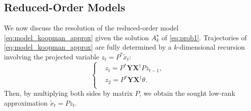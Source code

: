 \documentclass{article}
\newcommand{\Rr}{\mathds{R}}
\newcommand{\R}{P}
\newcommand{\Q}{Q}
\newcommand{\G}{ {\hat P}^{\dagger}}
\newcommand{\AAA}{\mathbf{X}}
\newcommand{\BBB}{\mathbf{Y}}
\newcommand{\ie}{\textit{i.e.}, }
\def\remCH#1{{\noindent\color{red}{{\footnotesize [CH: #1]}}}}
\def\addCH#1{{\noindent\color{red}{#1}}}
\begin{document}
\subsection{Reduced-Order Models}\label{sec:ROM}
We now discuss the resolution of  the reduced-order model \eqref{eq:model_koopman_approx} given the solution $A_k^\star$ of \eqref{eq:prob1}.
Trajectories of \eqref{eq:model_koopman_approx} are fully determined  by a $k$-dimensional recursion %
involving the projected variable  $z_t= \R^* \tilde x_t$:
\begin{equation}\label{eq:GaussLinSystReduced}
 \left\{\begin{aligned}
& z_t=\R^*\BBB \AAA^{\dagger}\R  z_{t-1} ,\\
&z_2=\R^*\BBB \AAA^{\dagger}\theta.  \\
\end{aligned}\right.
\end{equation}
Then, by multiplying both sides by matrix $\R$,   we  obtain the sought low-rank approximation $\tilde x_{t} = \R  z_t$.
%
\end{document}
